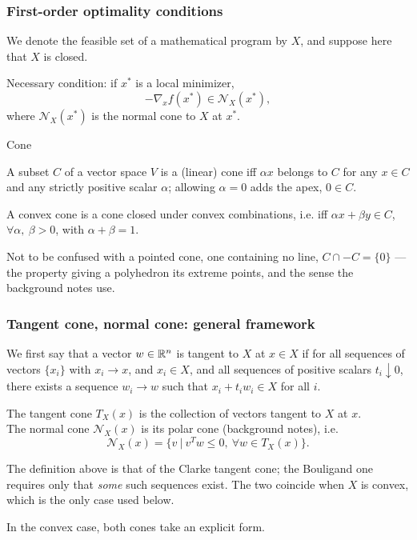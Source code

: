 \documentclass[aspectratio=169]{beamer}
\begin{document}
\begin{frame}
\frametitle{First-order optimality conditions}
\small

We denote the feasible set of a mathematical program by $X$, and suppose here that $X$ is closed.

\mbox{}

{\red Necessary condition}: if $x^*$ is a local minimizer,
\[
-\nabla_x f(x^*) \in \mathcal{N}_{X}(x^*),
\]
where $\mathcal{N}_{X}(x^*)$ is the normal cone to $X$ at $x^*$.

\mbox{}

{\blue Cone}

\mbox{}

A subset $C$ of a vector space $V$ is a (linear) {\red cone}
iff $\alpha x$ belongs to $C$ for any $x \in C$ and any strictly positive scalar $\alpha$;
allowing $\alpha = 0$ adds the apex, $0 \in C$.

A {\red convex cone} is a cone closed under convex combinations, i.e. iff $\alpha x + \beta y \in C$, $\forall \alpha,\ \beta > 0$, with $\alpha + \beta = 1$.

\mbox{}

{\footnotesize Not to be confused with a {\red pointed} cone, one containing no line, $C \cap -C = \lbrace 0 \rbrace$ --- the property giving a polyhedron its extreme points, and the sense the background notes use.}

\end{frame}


\begin{frame}
\frametitle{Tangent cone, normal cone: general framework}

We first say that a vector $w \in \mathbb{R}^n$ is tangent to $X$ at $x \in X$ if for all sequences of vectors $\lbrace x_i \rbrace$ with $x_i \rightarrow x$, and $x_i \in X$, and all sequences of positive scalars $t_i \downarrow 0$, there exists a sequence $w_i \rightarrow w$ such that $x_i + t_iw_i \in X$ for all $i$.

\mbox{}

The {\red tangent cone $T_{X}(x)$} is the collection of vectors tangent to $X$ at $x$. \\
The {\red normal cone $\mathcal{N}_{X}(x)$} is its {\red polar cone} (background notes), i.e.
\[
\mathcal{N}_{X}(x) = \lbrace v\ |\ v^Tw \leq 0,\ \forall w \in T_{X}(x) \rbrace.
\]

{\footnotesize The definition above is that of the {\red Clarke} tangent cone; the Bouligand one requires only that {\it some} such sequences exist. The two coincide when $X$ is convex, which is the only case used below.}

\mbox{}

In the convex case, both cones take an explicit form.

\end{frame}
\end{document}
